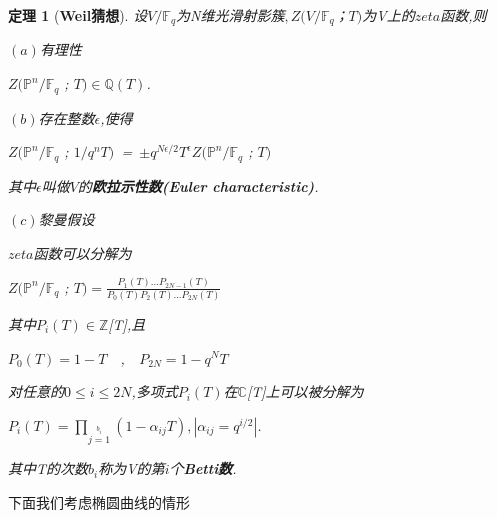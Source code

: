 \documentclass[11pt]{ctexart}
\newtheorem{thm}{定理}[section]
\begin{document}
\begin{thm}[\textbf{Weil猜想}\label{weil}]设$V/\mathbb{F}_q$为N维光滑射影簇$,Z(V/\mathbb{F}_q$；$T)$为V上的$zeta$函数,则

    $(a)$有理性
    \begin{center}
        $ Z(\mathbb{P}^n/\mathbb{F}_q$ ; $T)\in \mathbb{Q}(T)$.
    \end{center}

    $(b)$存在整数$\epsilon $,使得
    \begin{center}
        $ Z(\mathbb{P}^n/\mathbb{F}_q$ ; $1/q^nT)$~=~$\pm q^{N\epsilon/2}T^{\epsilon} Z(\mathbb{P}^n/\mathbb{F}_q$ ; $T)$
    \end{center}

    其中$\epsilon$叫做$V$的\textbf{欧拉示性数(Euler characteristic)}.


    $(c)$黎曼假设

    $zeta$函数可以分解为
    \begin{center}
        $ Z(\mathbb{P}^n/\mathbb{F}_q$ ; $T)=\frac{P_1(T)...P_{2N-1}(T)}{P_0(T)P_2(T)...P_{2N}(T)}$
    \end{center}

    其中$P_i(T)\in \mathbb{Z}$[T],且
    \begin{center}
        $P_0(T)=1-T$~~,~~$P_{2N}=1-q^NT$
    \end{center}

    对任意的$0\leqslant i \leqslant 2N$,多项式$P_i(T)$在$\mathbb{C}$[T]上可以被分解为
    \begin{center}
        $P_i(T)=\prod \limits_{j=1}\limits^{b_i}(1-\alpha_{ij}T)$$,|\alpha_{ij}=q^{i/2}|$.
    \end{center}

    其中T的次数$b_i$称为V的第$i$个\textbf{Betti数}.

\end{thm}
\noindent 下面我们考虑椭圆曲线的情形
\end{document}
